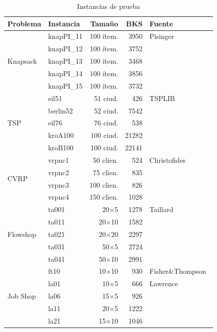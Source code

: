 \begin{table}[tb]
\caption{Instancias de prueba}
\label{tab:instancias}
\centering
\footnotesize
\setlength{\tabcolsep}{4pt}
\begin{tabular}{llrrl}
\toprule
\textbf{Problema} & \textbf{Instancia} & \textbf{Tamaño} &
  \textbf{BKS} & \textbf{Fuente} \\
\midrule
\multirow{5}{*}{Knapsack}
  & knapPI\_11 & 100 ítem. & 3950  & Pisinger~\cite{pisinger2005hard} \\
  & knapPI\_12 & 100 ítem. & 3752  & \\
  & knapPI\_13 & 100 ítem. & 3468  & \\
  & knapPI\_14 & 100 ítem. & 3856  & \\
  & knapPI\_15 & 100 ítem. & 3732  & \\
\midrule
\multirow{5}{*}{TSP}
  & eil51      &  51 ciud. &  426  & TSPLIB~\cite{reinelt1991tsplib} \\
  & berlin52   &  52 ciud. & 7542  & \\
  & eil76      &  76 ciud. &  538  & \\
  & kroA100    & 100 ciud. & 21282 & \\
  & kroB100    & 100 ciud. & 22141 & \\
\midrule
\multirow{4}{*}{CVRP}
  & vrpnc1     &  50 clien.&  524  & Christofides~\cite{christofides1979vehicle} \\
  & vrpnc2     &  75 clien.&  835  & \\
  & vrpnc3     & 100 clien.&  826  & \\
  & vrpnc4     & 150 clien.& 1028  & \\
\midrule
\multirow{5}{*}{Flowshop}
  & ta001      & 20$\times$5  & 1278  & Taillard~\cite{taillard1993benchmarks} \\
  & ta011      & 20$\times$10 & 1582  & \\
  & ta021      & 20$\times$20 & 2297  & \\
  & ta031      & 50$\times$5  & 2724  & \\
  & ta041      & 50$\times$10 & 2991  & \\
\midrule
\multirow{5}{*}{Job Shop}
  & ft10       & 10$\times$10 &  930  & Fisher\&Thompson~\cite{fisher1963probabilistic} \\
  & la01       &  10$\times$5 &  666  & Lawrence~\cite{lawrence1984resource} \\
  & la06       &  15$\times$5 &  926  & \\
  & la11       &  20$\times$5 & 1222  & \\
  & la21       &  15$\times$10& 1046  & \\
\bottomrule
\end{tabular}
\end{table}

